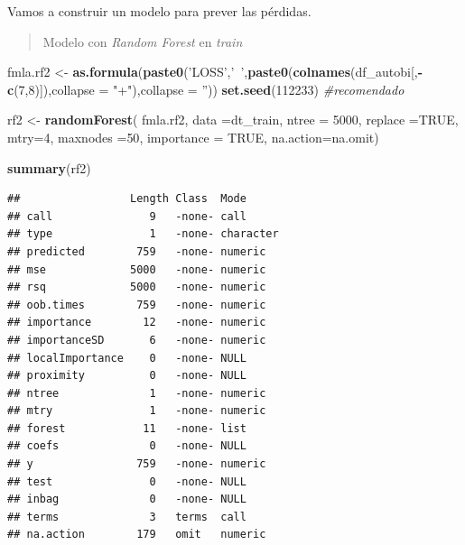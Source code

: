 \documentclass[]{book}
\newenvironment{Shaded}{\begin{snugshade}}{\end{snugshade}}
\newcommand{\CommentTok}[1]{\textcolor[rgb]{0.56,0.35,0.01}{\textit{#1}}}
\newcommand{\DataTypeTok}[1]{\textcolor[rgb]{0.13,0.29,0.53}{#1}}
\newcommand{\DecValTok}[1]{\textcolor[rgb]{0.00,0.00,0.81}{#1}}
\newcommand{\KeywordTok}[1]{\textcolor[rgb]{0.13,0.29,0.53}{\textbf{#1}}}
\newcommand{\NormalTok}[1]{#1}
\newcommand{\OperatorTok}[1]{\textcolor[rgb]{0.81,0.36,0.00}{\textbf{#1}}}
\newcommand{\OtherTok}[1]{\textcolor[rgb]{0.56,0.35,0.01}{#1}}
\newcommand{\StringTok}[1]{\textcolor[rgb]{0.31,0.60,0.02}{#1}}
\begin{document}
Vamos a construir un modelo para prever las pérdidas.

\begin{quote}
Modelo con \emph{Random Forest} en \emph{train}
\end{quote}

\begin{Shaded}
\begin{Highlighting}[]
\NormalTok{fmla.rf2 <-}\StringTok{ }\KeywordTok{as.formula}\NormalTok{(}\KeywordTok{paste0}\NormalTok{(}\StringTok{'LOSS'}\NormalTok{,}\StringTok{'~'}\NormalTok{,}\KeywordTok{paste0}\NormalTok{(}\KeywordTok{colnames}\NormalTok{(df_autobi[,}\OperatorTok{-}\KeywordTok{c}\NormalTok{(}\DecValTok{7}\NormalTok{,}\DecValTok{8}\NormalTok{)]),}\DataTypeTok{collapse =} \StringTok{"+"}\NormalTok{),}\DataTypeTok{collapse =} \StringTok{''}\NormalTok{))}
\KeywordTok{set.seed}\NormalTok{(}\DecValTok{112233}\NormalTok{) }\CommentTok{#recomendado}

\NormalTok{rf2 <-}\StringTok{ }\KeywordTok{randomForest}\NormalTok{( fmla.rf2,}
                     \DataTypeTok{data =}\NormalTok{dt_train,}
                     \DataTypeTok{ntree =} \DecValTok{5000}\NormalTok{,}
                     \DataTypeTok{replace =}\OtherTok{TRUE}\NormalTok{,}
                     \DataTypeTok{mtry=}\DecValTok{4}\NormalTok{,}
                     \DataTypeTok{maxnodes =}\DecValTok{50}\NormalTok{,}
                     \DataTypeTok{importance =} \OtherTok{TRUE}\NormalTok{,}
                     \DataTypeTok{na.action=}\NormalTok{na.omit)}

\KeywordTok{summary}\NormalTok{(rf2)}
\end{Highlighting}
\end{Shaded}

\begin{verbatim}
##                 Length Class  Mode     
## call               9   -none- call     
## type               1   -none- character
## predicted        759   -none- numeric  
## mse             5000   -none- numeric  
## rsq             5000   -none- numeric  
## oob.times        759   -none- numeric  
## importance        12   -none- numeric  
## importanceSD       6   -none- numeric  
## localImportance    0   -none- NULL     
## proximity          0   -none- NULL     
## ntree              1   -none- numeric  
## mtry               1   -none- numeric  
## forest            11   -none- list     
## coefs              0   -none- NULL     
## y                759   -none- numeric  
## test               0   -none- NULL     
## inbag              0   -none- NULL     
## terms              3   terms  call     
## na.action        179   omit   numeric
\end{verbatim}
\end{document}
